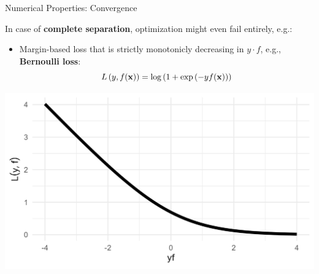 \documentclass[11pt,compress,t,notes=noshow, xcolor=table]{beamer}
\begin{document}



\begin{vbframe}{Numerical Properties: Convergence}

\footnotesize

In case of \textbf{complete separation}, optimization might even 
fail entirely, e.g.:

\vspace{0.5cm}

\begin{minipage}{0.7\textwidth}
  \begin{itemize}
    \item Margin-based loss that is strictly monotonicly decreasing in
    $y \cdot f$, e.g., \textbf{Bernoulli loss}: 
    $$L\left(y, f(\mathbf{x})\right) = \log \left( 1 + \exp \left( - y  f(\mathbf{x}) \right)\right)$$
  \end{itemize}
\end{minipage}%
\begin{minipage}{0.05\textwidth}
  \phantom{foo}
\end{minipage}%
\begin{minipage}{0.25\textwidth}
  \includegraphics[width=\textwidth]{figure/bernoulli.png}
\end{minipage}%


\end{vbframe}
\end{document}
